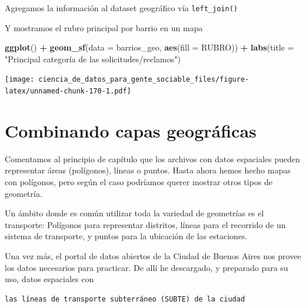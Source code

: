 \documentclass[spanish,]{book}
\newenvironment{Shaded}{\begin{snugshade}}{\end{snugshade}}
\newcommand{\DataTypeTok}[1]{\textcolor[rgb]{0.13,0.29,0.53}{#1}}
\newcommand{\KeywordTok}[1]{\textcolor[rgb]{0.13,0.29,0.53}{\textbf{#1}}}
\newcommand{\NormalTok}[1]{#1}
\newcommand{\OperatorTok}[1]{\textcolor[rgb]{0.81,0.36,0.00}{\textbf{#1}}}
\newcommand{\StringTok}[1]{\textcolor[rgb]{0.31,0.60,0.02}{#1}}
\begin{document}
Agregamos la información al dataset geográfico vía \texttt{left\_join()}

\begin{Shaded}
\end{Shaded}

Y mostramos el rubro principal por barrio en un mapa

\begin{Shaded}
\begin{Highlighting}[]
\KeywordTok{ggplot}\NormalTok{() }\OperatorTok{+}\StringTok{ }
\StringTok{    }\KeywordTok{geom_sf}\NormalTok{(}\DataTypeTok{data =}\NormalTok{ barrios_geo, }\KeywordTok{aes}\NormalTok{(}\DataTypeTok{fill =}\NormalTok{ RUBRO)) }\OperatorTok{+}
\StringTok{    }\KeywordTok{labs}\NormalTok{(}\DataTypeTok{title =} \StringTok{"Principal categoría de las solicitudes/reclamos"}\NormalTok{)}
\end{Highlighting}
\end{Shaded}

\texttt{[image: ciencia\_de\_datos\_para\_gente\_sociable\_files/figure-latex/unnamed-chunk-170-1.pdf]}

\hypertarget{combinando-capas-geogruxe1ficas}{%
\section{Combinando capas geográficas}\label{combinando-capas-geogruxe1ficas}}

Comentamos al principio de capítulo que los archivos con datos espaciales pueden representar áreas (polígonos), líneas o puntos. Hasta ahora hemos hecho mapas con polígonos, pero según el caso podríamos querer mostrar otros tipos de geometría.

Un ámbito donde es común utilizar toda la variedad de geometrías es el transporte: Polígonos para representar distritos, líneas para el recorrido de un sistema de transporte, y puntos para la ubicación de las estaciones.

Una vez más, el portal de datos abiertos de la Ciudad de Buenos Aires nos provee los datos necesarios para practicar. De allí he descargado, y preparado para su uso, datos espaciales con

\begin{verbatim}
las líneas de transporte subterráneo (SUBTE) de la ciudad
\end{verbatim}
\end{document}
